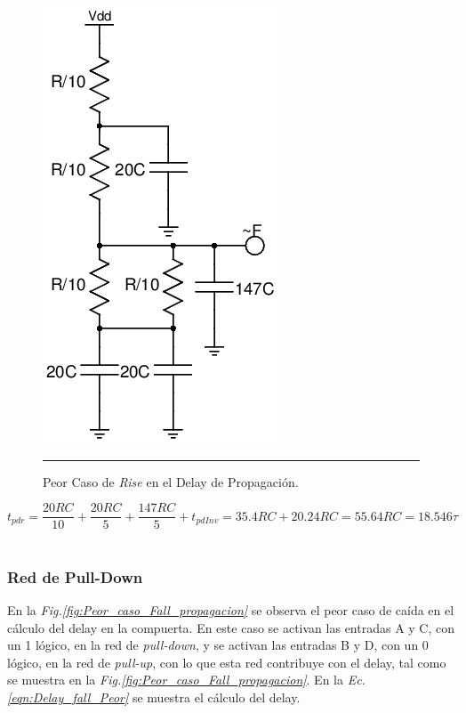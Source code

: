 \documentclass[12pt,a4paper]{article} %
\begin{document}
\begin{figure}[htbp]
  \centering
    \includegraphics[scale=0.45]{./Peor_caso_Rise_propagacion.png}
    \rule{35em}{0.5pt}
  \caption[IdealvsSim]{Peor Caso de \textit{Rise} en el Delay de Propagación.}
  \label{fig:Peor_caso_Rise_propagacion}
\end{figure}

\begin{equation}\label{eqn:Elmore_tpdr_Peor}
t_{pdr} = \frac{20RC}{10}+\frac{20RC}{5}+\frac{147RC}{5}+t_{pdInv}= 35.4RC + 20.24RC = 55.64RC = 18.546\tau
\end{equation}\\

\subsubsection{Red de Pull-Down}

En la \textit{Fig.\ref{fig:Peor_caso_Fall_propagacion}} se observa el peor caso de caída en el cálculo del delay en la compuerta. En este caso se activan las entradas A y C, con un 1 lógico, en la red de \textit{pull-down}, y se activan las entradas B y D, con un 0 lógico, en la red de \textit{pull-up}, con lo que esta red contribuye con el delay, tal como se muestra en la \textit{Fig.\ref{fig:Peor_caso_Fall_propagacion}}. En la \textit{Ec.\ref{eqn:Delay_fall_Peor}} se muestra el cálculo del delay.\\
\end{document}
